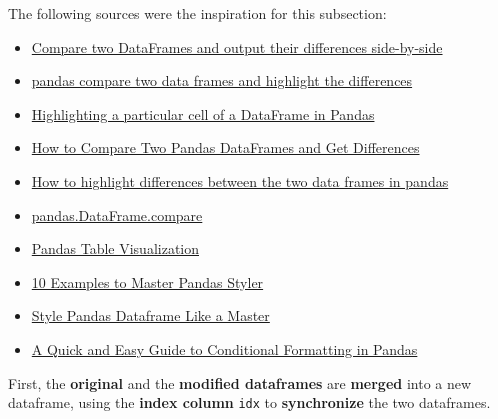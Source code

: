 \documentclass [oneside,10pt,a4paper,ngerman,BCOR10mm,headsepline,parindent,final]{scrartcl}
\providecommand{\tightlist}{%
      \setlength{\itemsep}{0pt}\setlength{\parskip}{0pt}}
\begin{document}
The following sources were the inspiration for this subsection:

\begin{itemize}
\tightlist
\item
  \href{https://stackoverflow.com/questions/17095101/compare-two-dataframes-and-output-their-differences-side-by-side/47112033\#47112033}{Compare
  two DataFrames and output their differences side-by-side}
\item
  \href{https://stackoverflow.com/questions/71604701/pandas-compare-two-data-frames-and-highlight-the-differences/71617662\#71617662}{pandas
  compare two data frames and highlight the differences}
\item
  \href{https://www.skytowner.com/explore/highlighting_a_particular_cell_of_a_dataframe_in_pandas}{Highlighting
  a particular cell of a DataFrame in Pandas}
\item
  \href{https://datascientyst.com/compare-two-pandas-dataframes-get-differences/}{How
  to Compare Two Pandas DataFrames and Get Differences}
\item
  \href{https://stackoverflow.com/questions/70566100/how-to-highlight-differences-between-the-two-data-frames-in-pandas}{How
  to highlight differences between the two data frames in pandas}
\item
  \href{https://pandas.pydata.org/docs/dev/reference/api/pandas.DataFrame.compare.html}{pandas.DataFrame.compare}
\item
  \href{https://pandas.pydata.org/pandas-docs/stable/user_guide/style.html}{Pandas
  Table Visualization}
\item
  \href{https://towardsdatascience.com/10-examples-to-master-pandas-styler-408ea794e91}{10
  Examples to Master Pandas Styler}
\item
  \href{https://towardsdatascience.com/style-pandas-dataframe-like-a-master-6b02bf6468b0}{Style
  Pandas Dataframe Like a Master}
\item
  \href{https://towardsdatascience.com/a-quick-and-easy-guide-to-conditional-formatting-in-pandas-8783035071ee}{A
  Quick and Easy Guide to Conditional Formatting in Pandas}
\end{itemize}

    First, the \textbf{original} and the \textbf{modified dataframes} are
\textbf{merged} into a new dataframe, using the \textbf{index column}
\texttt{idx} to \textbf{synchronize} the two dataframes.
\end{document}
